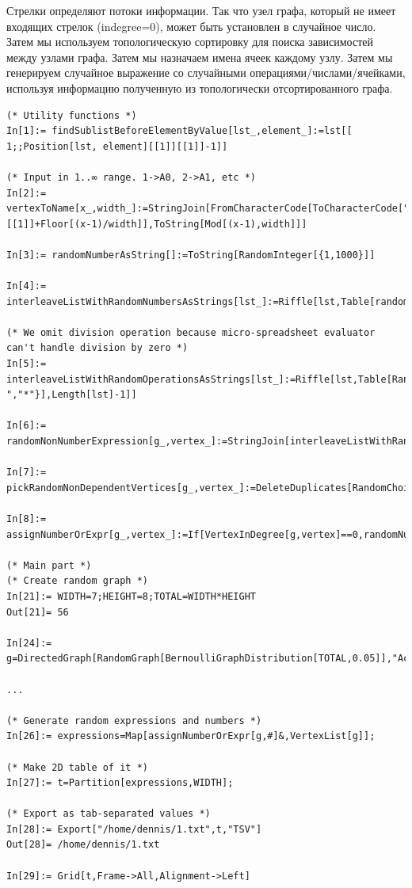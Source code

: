 Стрелки определяют потоки информации.
Так что узел графа, который не имеет входящих стрелок (indegree=0), может быть установлен в случайное число.
Затем мы используем топологическую сортировку для поиска зависимостей между узлами графа.
Затем мы назначаем имена ячеек каждому узлу.
Затем мы генерируем случайное выражение со случайными операциями/числами/ячейками, используя информацию
полученную из топологически отсортированного графа.

\begin{lstlisting}
(* Utility functions *)
In[1]:= findSublistBeforeElementByValue[lst_,element_]:=lst[[ 1;;Position[lst, element][[1]][[1]]-1]]

(* Input in 1..∞ range. 1->A0, 2->A1, etc *)
In[2]:= vertexToName[x_,width_]:=StringJoin[FromCharacterCode[ToCharacterCode["A"][[1]]+Floor[(x-1)/width]],ToString[Mod[(x-1),width]]]

In[3]:= randomNumberAsString[]:=ToString[RandomInteger[{1,1000}]]

In[4]:= interleaveListWithRandomNumbersAsStrings[lst_]:=Riffle[lst,Table[randomNumberAsString[],Length[lst]-1]]

(* We omit division operation because micro-spreadsheet evaluator can't handle division by zero *)
In[5]:= interleaveListWithRandomOperationsAsStrings[lst_]:=Riffle[lst,Table[RandomChoice[{"+","-","*"}],Length[lst]-1]]

In[6]:= randomNonNumberExpression[g_,vertex_]:=StringJoin[interleaveListWithRandomOperationsAsStrings[interleaveListWithRandomNumbersAsStrings[Map[vertexToName[#,WIDTH]&,pickRandomNonDependentVertices[g,vertex]]]]]

In[7]:= pickRandomNonDependentVertices[g_,vertex_]:=DeleteDuplicates[RandomChoice[findSublistBeforeElementByValue[TopologicalSort[g],vertex],RandomInteger[{1,5}]]]

In[8]:= assignNumberOrExpr[g_,vertex_]:=If[VertexInDegree[g,vertex]==0,randomNumberAsString[],randomNonNumberExpression[g,vertex]]

(* Main part *) 
(* Create random graph *)
In[21]:= WIDTH=7;HEIGHT=8;TOTAL=WIDTH*HEIGHT
Out[21]= 56

In[24]:= g=DirectedGraph[RandomGraph[BernoulliGraphDistribution[TOTAL,0.05]],"Acyclic"];

...

(* Generate random expressions and numbers *)
In[26]:= expressions=Map[assignNumberOrExpr[g,#]&,VertexList[g]];

(* Make 2D table of it *)
In[27]:= t=Partition[expressions,WIDTH];

(* Export as tab-separated values *)
In[28]:= Export["/home/dennis/1.txt",t,"TSV"]
Out[28]= /home/dennis/1.txt

In[29]:= Grid[t,Frame->All,Alignment->Left]
\end{lstlisting}

